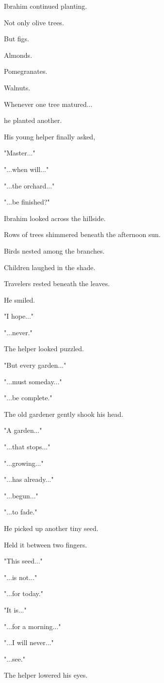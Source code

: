 \documentclass[12pt,openany]{book}
\begin{document}
Ibrahim continued planting.

Not only olive trees.

But figs.

Almonds.

Pomegranates.

Walnuts.

Whenever one tree matured...

he planted another.

His young helper finally asked,

"Master..."

"...when will..."

"...the orchard..."

"...be finished?"

Ibrahim looked across the hillside.

Rows of trees shimmered beneath the afternoon sun.

Birds nested among the branches.

Children laughed in the shade.

Travelers rested beneath the leaves.

He smiled.

"I hope..."

"...never."

The helper looked puzzled.

"But every garden..."

"...must someday..."

"...be complete."

The old gardener gently shook his head.

"A garden..."

"...that stops..."

"...growing..."

"...has already..."

"...begun..."

"...to fade."

He picked up another tiny seed.

Held it between two fingers.

"This seed..."

"...is not..."

"...for today."

"It is..."

"...for a morning..."

"...I will never..."

"...see."

The helper lowered his eyes.
\end{document}
